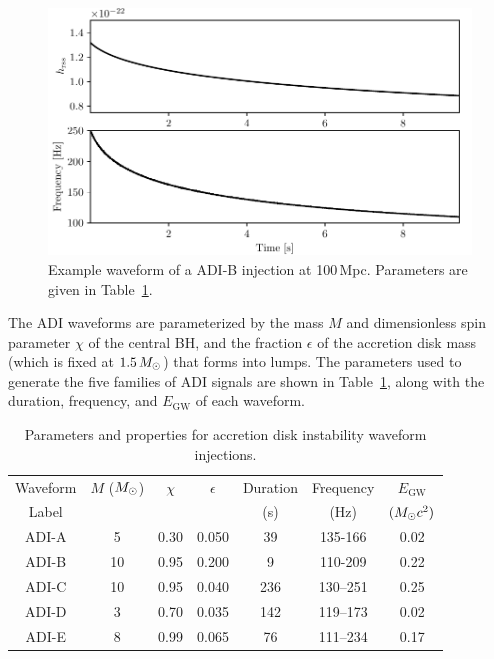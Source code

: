\begin{figure}[h]
	\includegraphics{figures/grb/vanputten.pdf}
	\caption{Example waveform of a ADI-B injection at 100\,Mpc. Parameters are given in Table~\protect\ref{tab:adi}.}
	\label{fig:vanputten}
\end{figure}

The ADI waveforms are parameterized by the mass $M$ and dimensionless spin parameter $\chi$ of the central \ac{BH}, and the fraction $\epsilon$ of the  accretion disk mass (which is fixed at $1.5\,M_{\odot}$) that forms into lumps.
The parameters used to generate the five families of \ac{ADI} signals are shown in Table~\ref{tab:adi}, along with the duration, frequency, and $E_{\text{GW}}$ of each waveform.

\begin{table}[h!]
	\centering
	\caption
  {Parameters and properties for accretion disk instability waveform injections.
  \label{tab:adi}}
	\begin{tabular}{c c c c c c c}
		\hline
		Waveform & $M$ ($M_{\odot}$) & $\chi$ & $\epsilon$ & Duration & Frequency & $E_{\text{GW}}$ \\
		Label &  &  &  & (s) & (Hz) & $(M_{\odot} c^2)$ \\
		\hline
  	\hline
    ADI-A & 5 & 0.30 & 0.050 & 39 & 135-166 & 0.02 \\
    ADI-B & 10 & 0.95 & 0.200 & 9 & 110-209 & 0.22 \\
    ADI-C & 10 & 0.95 & 0.040 & 236 & 130–251 & 0.25 \\
    ADI-D & 3 & 0.70 & 0.035 & 142 & 119–173 & 0.02 \\
    ADI-E & 8 & 0.99 & 0.065 & 76 & 111–234 & 0.17 \\
		\hline
	\end{tabular}
\end{table}


